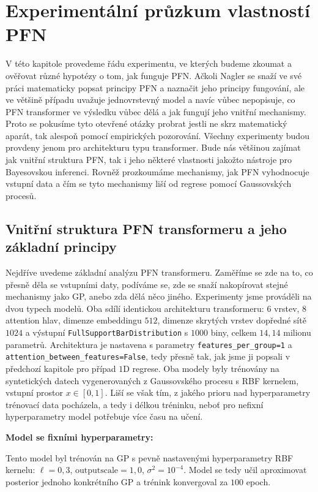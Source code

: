 \chapter{Experimentální průzkum vlastností PFN}

V této kapitole provedeme řádu experimentu, ve kterých budeme zkoumat a ověřovat různé hypotézy o tom, jak funguje PFN.
Ačkoli Nagler se snaží ve své práci matematicky popsat principy PFN a naznačit jeho principy fungování, ale ve většině případu uvažuje jednovrstevný model a navíc vůbec nepopisuje, co PFN transformer ve výsledku vůbec dělá a jak fungují jeho vnitřní mechanismy.
Proto se pokusíme tyto otevřené otázky probrat jestli ne skrz matematický aparát, tak alespoň pomocí empirických pozorování.
Všechny experimenty budou provdeny jenom pro architekturu typu transformer. 
Bude nás většinou zajímat jak vnitřní struktura PFN, tak i jeho některé vlastnosti jakožto nástroje pro Bayesovskou inferenci.
Rovněž prozkoumáme mechanismy, jak PFN vyhodnocuje vstupní data a čím se tyto mechanismy liší od regrese pomocí Gaussovských procesů.

\section{Vnitřní struktura PFN transformeru a jeho základní principy}

Nejdříve uvedeme základní analýzu PFN transformeru.
Zaměříme se zde na to, co přesně děla se vstupními daty, podíváme se, zde se snaží nakopírovat stejné mechanismy jako GP, anebo zda dělá něco jiného.
Experimenty jsme prováděli na dvou typech modelů.
Oba sdílí identickou architekturu transformeru: $6$ vrstev, $8$ attention hlav, dimenze embeddingu $512$, dimenze skrytých vrstev dopředné sítě $1024$ a výstupní \texttt{FullSupportBarDistribution} s $1000$ biny, celkem $14{,}14$ milionu parametrů.
Architektura je nastavena s parametry \lstinline|features_per_group=1| a \lstinline|attention_between_features=False|, tedy přesně tak, jak jsme ji popsali v předchozí kapitole pro případ $1$D regrese.
Oba modely byly trénovány na syntetických datech vygenerovaných z Gaussovského procesu s RBF kernelem, vstupní prostor $x \in [0, 1]$.
Liší se však tím, z jakého prioru nad hyperparametry trénovací data pocházela, a tedy i délkou tréninku, neboť pro nefixní hyperparametry model potřebuje více času na učení.

\textbf{Model se fixními hyperparametry:} 

Tento model byl trénován na GP s pevně nastavenými hyperparametry RBF kernelu: $\ell = 0{,}3$, $\text{outputscale} = 1{,}0$, $\sigma^2 = 10^{-4}$.
Model se tedy učil aproximovat posterior jednoho konkrétního GP a trénink konvergoval za $100$ epoch.

